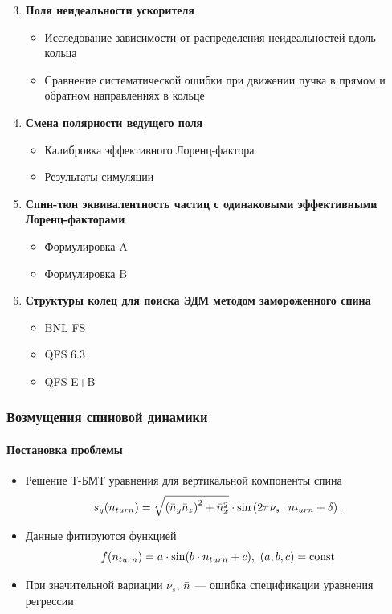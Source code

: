 \documentclass[14pt]{beamer}
\newcommand{\ntrn}{n_{turn}}
\begin{document}
\begin{frame}
	\begin{enumerate}	\setcounter{enumi}{2}
		\item \textbf{Поля неидеальности ускорителя}
		\begin{itemize}
			\item Исследование зависимости от распределения неидеальностей вдоль кольца
			\item Сравнение систематической ошибки при движении пучка в прямом и обратном направлениях в кольце
		\end{itemize}
		\item \textbf{Смена полярности ведущего поля}
		\begin{itemize}
			\item Калибровка эффективного Лоренц-фактора
			\item Результаты симуляции
		\end{itemize}
	\end{enumerate}
\end{frame}
\begin{frame} %
	\begin{enumerate}  \setcounter{enumi}{4}
		\item \textbf{Спин-тюн эквивалентность частиц с одинаковыми эффективными Лоренц-факторами}
		\begin{itemize}
			\item Формулировка A
			\item Формулировка B
		\end{itemize}
		\item \textbf{Структуры колец для поиска ЭДМ методом замороженного спина}
		\begin{itemize}
			\item BNL FS
			\item QFS 6.3
			\item QFS E+B
		\end{itemize}
	\end{enumerate}
\end{frame}
\begin{frame}\frametitle{Возмущения спиновой динамики}
	\framesubtitle{Постановка проблемы}
	\begin{itemize}
		\item Решение Т-БМТ уравнения для вертикальной компоненты спина
		\[
		s_y(n_{turn}) = \sqrt{\bkt{\nbar_y\nbar_z}^2 + \nbar_x^2}\cdot\sin\bkt{2\pi\nu_s\cdot\ntrn + \delta}.
		\]
		\item Данные фитируются функцией
		\[
		f(\ntrn) = a\cdot \sin(b\cdot \ntrn + c), ~(a,b,c)=\const
		\]
		\item При значительной вариации $\nu_s$, $\bar n$ --- ошибка спецификации уравнения регрессии
	\end{itemize}
\end{frame}
\end{document}
